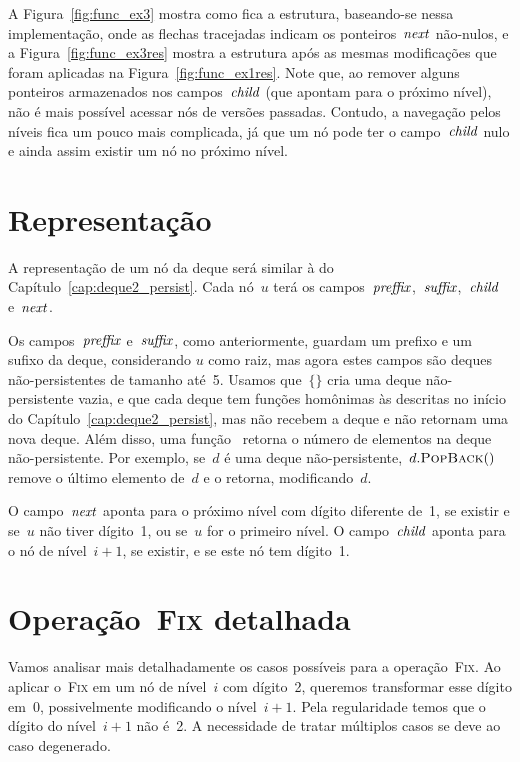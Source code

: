 \documentclass[main.tex]{subfiles}
\begin{document}
A Figura~\ref{fig:func_ex3} mostra como fica a estrutura, baseando-se nessa implementação, onde as flechas tracejadas indicam os ponteiros~$\mathit{next}$ não-nulos, e a Figura~\ref{fig:func_ex3res} mostra a estrutura após as mesmas modificações que foram aplicadas na Figura~\ref{fig:func_ex1res}. Note que, ao remover alguns ponteiros armazenados nos campos~$\mathit{child}$ (que apontam para o próximo nível), não é mais possível acessar nós de versões passadas. Contudo, a navegação pelos níveis fica um pouco mais complicada, já que um nó pode ter o campo~$\mathit{child}$ nulo e ainda assim existir um nó no próximo nível.

\section{Representação}

A representação de um nó da deque será similar à do Capítulo~\ref{cap:deque2_persist}. Cada nó~$u$ terá os campos~$\mathit{preffix}$,~$\mathit{suffix}$,~$\mathit{child}$ e~$\mathit{next}$.

Os campos~$\mathit{preffix}$ e~$\mathit{suffix}$, como anteriormente, guardam um prefixo e um sufixo da deque, considerando $u$ como raiz, mas agora estes campos são deques não-persistentes de tamanho até~5. Usamos que~$\{\}$ cria uma deque não-persistente vazia, e que cada deque tem funções homônimas às descritas no início do Capítulo~\ref{cap:deque2_persist}, mas não recebem a deque e não retornam uma nova deque. Além disso, uma função~ retorna o número de elementos na deque não-persistente. Por exemplo, se~$d$ é uma deque não-persistente,~$d.\mbox{\textsc{PopBack}$()$}$ remove o último elemento de~$d$ e o retorna, modificando~$d$.

O campo~$\mathit{next}$ aponta para o próximo nível com dígito diferente de~1, se existir e se~$u$ não tiver dígito~1, ou se~$u$ for o primeiro nível. O campo~$\mathit{child}$ aponta para o nó de nível~$i + 1$, se existir, e se este nó tem dígito~1.

\section{Operação~{\normalfont \textsc{Fix}} detalhada} \label{sec:fix_det}

Vamos analisar mais detalhadamente os casos possíveis para a operação~\textsc{Fix}. Ao aplicar o~\textsc{Fix} em um nó de nível~$i$ com dígito~2, queremos transformar esse dígito em~0, possivelmente modificando o nível~$i+1$. Pela regularidade temos que o dígito do nível~$i+1$ não é~2. A necessidade de tratar múltiplos casos se deve ao caso degenerado.
\end{document}

